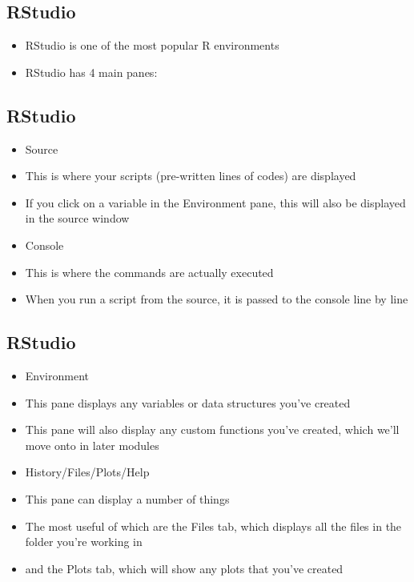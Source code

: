 \documentclass[]{article}
\providecommand{\tightlist}{%
  \setlength{\itemsep}{0pt}\setlength{\parskip}{0pt}}
\begin{document}
\subsection{RStudio}\label{rstudio}

\begin{itemize}
\tightlist
\item
  RStudio is one of the most popular R environments
\item
  RStudio has 4 main panes:
\end{itemize}

\subsection{RStudio}\label{rstudio-1}

\begin{itemize}
\item
  Source
\item
  This is where your scripts (pre-written lines of codes) are displayed
\item
  If you click on a variable in the Environment pane, this will also be
  displayed in the source window
\item
  Console
\item
  This is where the commands are actually executed
\item
  When you run a script from the source, it is passed to the console
  line by line
\end{itemize}

\subsection{RStudio}\label{rstudio-2}

\begin{itemize}
\item
  Environment
\item
  This pane displays any variables or data structures you've created
\item
  This pane will also display any custom functions you've created, which
  we'll move onto in later modules
\item
  History/Files/Plots/Help
\item
  This pane can display a number of things
\item
  The most useful of which are the Files tab, which displays all the
  files in the folder you're working in
\item
  and the Plots tab, which will show any plots that you've created
\end{itemize}
\end{document}
